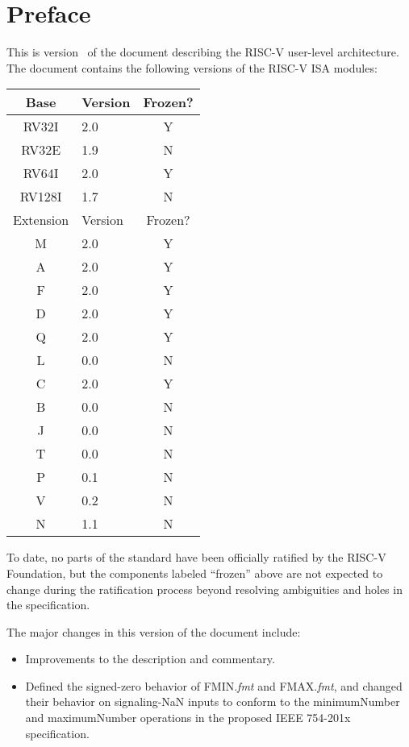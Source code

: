 \chapter{Preface}

This is version \specrev\ of the document describing the RISC-V
user-level architecture.  The document contains the following
versions of the RISC-V ISA modules:
\begin{table}[hbt]
  \centering
  \begin{tabular}{|c|l|c|}
    \hline
    Base     & Version & Frozen? \\
    \hline
    RV32I    & 2.0 & Y \\
    RV32E    & 1.9 & N \\
    RV64I    & 2.0 & Y \\
    RV128I   & 1.7 & N \\
    \hline
    Extension & Version & Frozen? \\
    \hline
    M        & 2.0 & Y \\
    A        & 2.0 & Y \\
    F        & 2.0 & Y \\
    D        & 2.0 & Y \\
    Q        & 2.0 & Y \\
    L        & 0.0 & N \\
    C        & 2.0 & Y \\
    B        & 0.0 & N \\
    J        & 0.0 & N \\
    T        & 0.0 & N \\
    P        & 0.1 & N \\
    V        & 0.2 & N \\
    N        & 1.1 & N \\
    \hline
  \end{tabular}
\end{table}

To date, no parts of the standard have been officially ratified by the
RISC-V Foundation, but the components labeled ``frozen'' above are not
expected to change during the ratification process beyond resolving
ambiguities and holes in the specification.

The major changes in this version of the document include:
\begin{itemize}
\parskip 0pt
\itemsep 1pt
\item Improvements to the description and commentary.
\item Defined the signed-zero behavior of FMIN.{\em fmt} and FMAX.{\em fmt},
  and changed their behavior on signaling-NaN inputs to conform to the
  minimumNumber and maximumNumber operations in the proposed IEEE 754-201x
  specification.
\end{itemize}
~\\

